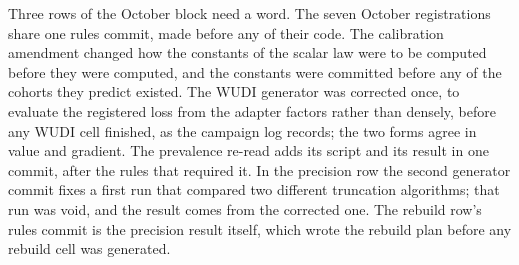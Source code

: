 Three rows of the October block need a word. The seven October registrations
share one rules commit, made before any of their code. The calibration
amendment changed how the constants of the scalar law were to be computed
before they were computed, and the constants were committed before any of the
cohorts they predict existed. The WUDI generator was corrected once, to
evaluate the registered loss from the adapter factors rather than densely,
before any WUDI cell finished, as the campaign log records; the two forms agree
in value and gradient. The
prevalence re-read adds its script and its result in one commit, after the
rules that required it. In the precision row the second generator commit fixes
a first run that compared two different truncation algorithms; that run was
void, and the result comes from the corrected one. The rebuild row's rules
commit is the precision result itself, which wrote the rebuild plan before any
rebuild cell was generated.
